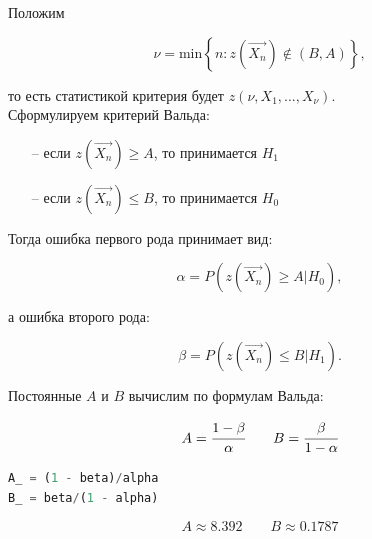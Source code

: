 \documentclass[a4paper, 14pt]{extarticle}
\begin{document}
Положим 

\begin{equation*}
    \nu = \text{min}\left\{ n: z\left( \vec{X_n} \right) \notin (B, A) \right\},
\end{equation*}

\vspace{10pt}

то есть статистикой критерия будет $z(\nu, X_1, ..., X_\nu)$.\\

Сформулируем критерий Вальда:
\begin{itemize}
    \item[--] если $z\left( \vec{X_n} \right) \geq A$, то принимается $H_1$ 
    \item[--] если $z\left( \vec{X_n} \right) \leq B$, то принимается $H_0$ 
\end{itemize}

\vspace{10pt}

Тогда ошибка первого рода принимает вид:

\begin{equation*}
    \alpha = P \left( z\left( \vec{X_n} \right) \geq A | H_0 \right),
\end{equation*}

а ошибка второго рода:

\begin{equation*}
    \beta = P \left( z\left( \vec{X_n} \right) \leq B | H_1 \right).
\end{equation*}

\vspace{10pt}

Постоянные $A$ и $B$ вычислим по формулам Вальда:

\begin{equation*}
    A = \cfrac{1 - \beta}{\alpha} \qquad B = \cfrac{\beta}{1 - \alpha}
\end{equation*}

\begin{center}
  \begin{lstlisting}[language=Python]
A_ = (1 - beta)/alpha
B_ = beta/(1 - alpha)
  \end{lstlisting}
\end{center}

\vspace{-20pt}

\begin{equation*}
    A \approx 8.392 \qquad B \approx 0.1787
\end{equation*}
\end{document}
